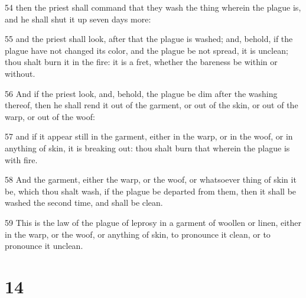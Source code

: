 \par 54 then the priest shall command that they wash the thing wherein the plague is, and he shall shut it up seven days more:
\par 55 and the priest shall look, after that the plague is washed; and, behold, if the plague have not changed its color, and the plague be not spread, it is unclean; thou shalt burn it in the fire: it is a fret, whether the bareness be within or without.
\par 56 And if the priest look, and, behold, the plague be dim after the washing thereof, then he shall rend it out of the garment, or out of the skin, or out of the warp, or out of the woof:
\par 57 and if it appear still in the garment, either in the warp, or in the woof, or in anything of skin, it is breaking out: thou shalt burn that wherein the plague is with fire.
\par 58 And the garment, either the warp, or the woof, or whatsoever thing of skin it be, which thou shalt wash, if the plague be departed from them, then it shall be washed the second time, and shall be clean.
\par 59 This is the law of the plague of leprosy in a garment of woollen or linen, either in the warp, or the woof, or anything of skin, to pronounce it clean, or to pronounce it unclean.

\chapter{14}

